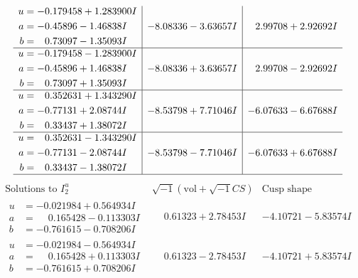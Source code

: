 \documentclass[1p]{elsarticle_modified}
\theoremstyle{definition}
\newcommand{\I}{\sqrt{-1}}
\begin{document}
$$\begin{array}{c|c|c}
\begin{aligned}
u &= -0.179458 + 1.283900 I \\
a &= -0.45896 - 1.46838 I \\
b &= \phantom{-}0.73097 - 1.35093 I\end{aligned}
 & -8.08336 - 3.63657 I & \phantom{-}2.99708 + 2.92692 I \\ \hline\begin{aligned}
u &= -0.179458 - 1.283900 I \\
a &= -0.45896 + 1.46838 I \\
b &= \phantom{-}0.73097 + 1.35093 I\end{aligned}
 & -8.08336 + 3.63657 I & \phantom{-}2.99708 - 2.92692 I \\ \hline\begin{aligned}
u &= \phantom{-}0.352631 + 1.343290 I \\
a &= -0.77131 + 2.08744 I \\
b &= \phantom{-}0.33437 + 1.38072 I\end{aligned}
 & -8.53798 + 7.71046 I & -6.07633 - 6.67688 I \\ \hline\begin{aligned}
u &= \phantom{-}0.352631 - 1.343290 I \\
a &= -0.77131 - 2.08744 I \\
b &= \phantom{-}0.33437 - 1.38072 I\end{aligned}
 & -8.53798 - 7.71046 I & -6.07633 + 6.67688 I\\
 \hline 
 \end{array}$$\newpage$$\begin{array}{c|c|c}  
\text{Solutions to }I^u_{2}& \I (\text{vol} + \sqrt{-1}CS) & \text{Cusp shape}\\
 \hline 
\begin{aligned}
u &= -0.021984 + 0.564934 I \\
a &= \phantom{-}0.165428 - 0.113303 I \\
b &= -0.761615 - 0.708206 I\end{aligned}
 & \phantom{-}0.61323 + 2.78453 I & -4.10721 - 5.83574 I \\ \hline\begin{aligned}
u &= -0.021984 - 0.564934 I \\
a &= \phantom{-}0.165428 + 0.113303 I \\
b &= -0.761615 + 0.708206 I\end{aligned}
 & \phantom{-}0.61323 - 2.78453 I & -4.10721 + 5.83574 I \\ \hline\begin{aligned}

\end{aligned}
\end{array}$$
\end{document}
